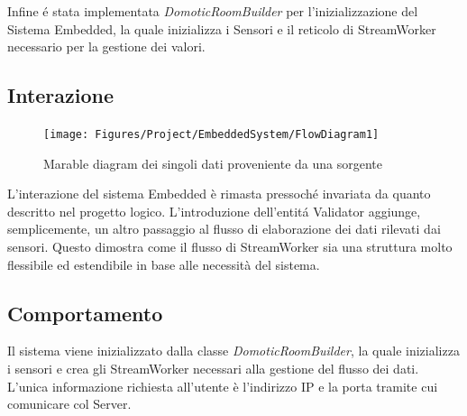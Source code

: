 Infine \'e stata implementata \textit{DomoticRoomBuilder} per l'inizializzazione del Sistema Embedded, la quale inizializza i Sensori e il reticolo di StreamWorker necessario per la gestione dei valori.

\subsection{Interazione}

\begin{figure}[ht]
\centering
\texttt{[image: Figures/Project/EmbeddedSystem/FlowDiagram1]}
\caption{Marable diagram dei singoli dati proveniente da una sorgente}
\end{figure}

L'interazione del sistema Embedded è rimasta pressoch\'e invariata da quanto descritto nel progetto logico.
L'introduzione dell'entit\'a Validator aggiunge, semplicemente, un altro passaggio al flusso di elaborazione dei dati rilevati dai sensori.
Questo dimostra come il flusso di StreamWorker sia una struttura molto flessibile ed estendibile in base alle necessità del sistema.

\subsection{Comportamento}

Il sistema viene inizializzato dalla classe \textit{DomoticRoomBuilder}, la quale inizializza i sensori e crea gli StreamWorker necessari alla gestione del flusso dei dati.
L'unica informazione richiesta all'utente è l'indirizzo IP e la porta tramite cui comunicare col Server.
